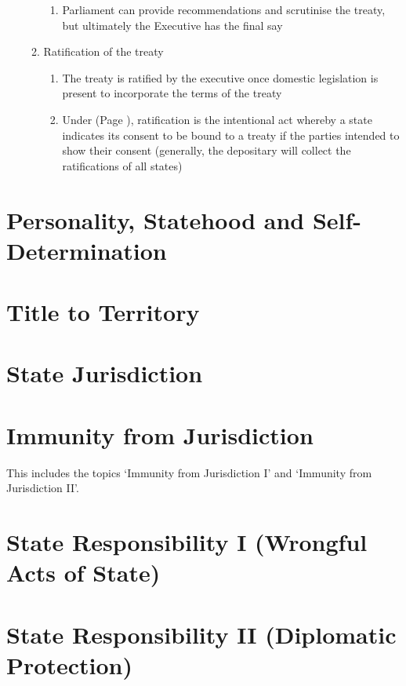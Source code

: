 \begin{enumerate}
\begin{enumerate}
\begin{enumerate}
            \item Parliament can provide recommendations and scrutinise the treaty, but ultimately the Executive has the final say
        \end{enumerate}
        \item Ratification of the treaty
        \begin{enumerate}
            \item The treaty is ratified by the executive once domestic legislation is present to incorporate the terms of the treaty
            \item Under  (Page \pageref{VCLT Art 2}), ratification is the intentional act whereby a state indicates its consent to be bound to a treaty if the parties intended to show their consent (generally, the depositary will collect the ratifications of all states)
        \end{enumerate}
    \end{enumerate}
\end{enumerate}

\section{Personality, Statehood and Self-Determination}

\section{Title to Territory}

\section{State Jurisdiction}

\section{Immunity from Jurisdiction}
This includes the topics `Immunity from Jurisdiction I' and `Immunity from Jurisdiction II'.

\section{State Responsibility I (Wrongful Acts of State)}

\section{State Responsibility II (Diplomatic Protection)} 

